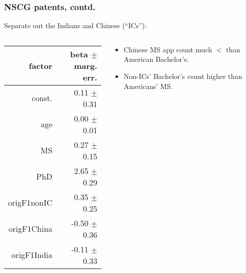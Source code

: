 \documentclass{beamer}
\begin{document}
\begin{frame}
\frametitle{NSCG patents, contd.}

\pause

Separate out the Indians and Chinese (``ICs''): 
\pause

\medskip

\begin{columns}

  \begin{column}{0.5\textwidth}
   \begin{tabular}{|r|r|}
   \hline
   factor & beta $\pm$ marg. err.  \\ \hline
   \hline
   const. & 0.11 {\small $\pm$ 0.31} \\ \hline
   age & 0.00 {\small $\pm$ 0.01} \\ \hline
   MS & 0.27 {\small $\pm$ 0.15} \\ \hline
   PhD & 2.65 {\small $\pm$ 0.29} \\ \hline
   origF1nonIC & 0.35 {\small $\pm$ 0.25} \\ \hline
   origF1China & -0.50 {\small $\pm$ 0.36} \\ \hline 
   origF1India & -0.11 {\small $\pm$ 0.33} \\ \hline
   \end{tabular}
  \end{column}
  
  \begin{column}{0.5\textwidth}
  \pause
  \begin{itemize}
  \item Chinese MS app count much $<$ than American Bachelor's.
  \pause
  \item Non-ICs' Bachelor's count higher than Americans' MS. 
  \end{itemize}
  \end{column}

\end{columns}

\end{frame}
\end{document}
